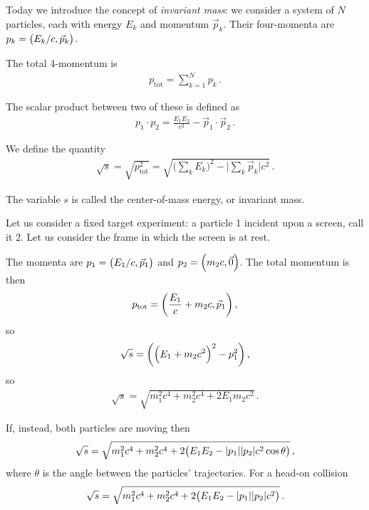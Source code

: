 \documentclass[main.tex]{subfiles}
\begin{document}

Today we introduce the concept of \emph{invariant mass}: we consider a system of \(N\) particles, each with energy \(E_{k}\) and momentum \(\vec{p}_{k}\). 
Their four-momenta are \(p_{k} = \qty(E_{k} / c, \vec{p}_{k})\). 

The total 4-momentum is 
%
\begin{align}
p_{\text{tot}} = \sum_{k=1}^{N} p_{k}
\,.
\end{align}

The scalar product between two of these is defined as 
%
\begin{align}
p_1 \cdot p_{2} = \frac{E_1 E_2 }{c^2} - \vec{p}_{1} \cdot \vec{p}_{2}
\,.
\end{align}

We define the quantity 
%
\begin{align}
\sqrt{s} = \sqrt{p^2 _{\text{tot}}}
= \sqrt{\big(\sum _{k} E_{k}\big)^2 - \big|\sum _{k} \vec{p}_{k}\big| c^2}
\,.
\end{align}

The variable \(s\) is called the center-of-mass energy, or invariant mass. 

Let us consider a fixed target experiment: a particle 1 incident upon a screen, call it 2. 
Let us consider the frame in which the screen is at rest. 

The momenta are \(p_1 = \qty(E_1 / c,  \vec{p}_{1})\) and \(p_2 = \qty(m_2 c, \vec{0})\). 
The total momentum is then 
%
\begin{align}
p _{\text{tot}} = \qty(\frac{E_1}{c} + m_2 c , \vec{p}_{1})
\,,
\end{align}
%
so 
%
\begin{align}
\sqrt{s} = \qty(\qty(E_1 + m_2 c^2)^2 - p_1^2)
\,,
\end{align}
%
so 
%
\begin{align}
\sqrt{s} = \sqrt{m_1^2c^{4} + m_2^2c^{4} + 2 E_1 m_2 c^2}
\,.
\end{align}

If, instead, both particles are moving then  
%
\begin{align}
\sqrt{s} = \sqrt{m_1^2c^{4} + m_2^2c^{4} + 2 \qty(E_1 E_2 - \abs{p_1 } \abs{p_2 } c^2 \cos \theta )}
\,,
\end{align}
%
where \(\theta \) is the angle between the particles' trajectories. For a head-on collision 
%
\begin{align}
\sqrt{s} = 
\sqrt{m_1^2c^{4} + m_2^2c^{4} + 2 \qty(E_1 E_2 - \abs{p_1 } \abs{p_2 } c^2)}
\,.
\end{align}
\end{document}
